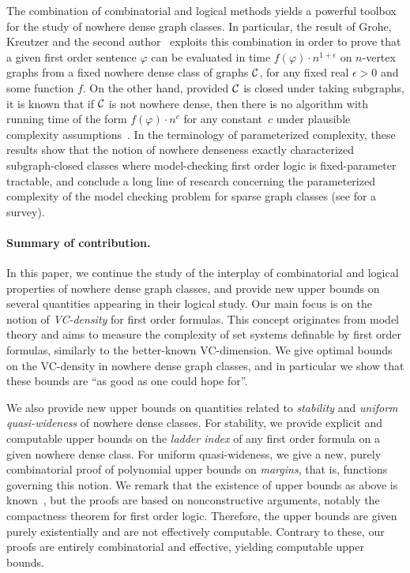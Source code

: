 The combination of combinatorial and logical methods yields a powerful toolbox for the study
of nowhere dense graph classes. In particular, 
the result of Grohe, Kreutzer and the second author~\cite{grohe2014deciding} exploits 
this combination in order to prove that  a given
first order sentence $\varphi$ can be evaluated in time 
$f(\varphi)\cdot n^{1+\epsilon}$ on $n$-vertex graphs from a fixed nowhere dense class of graphs $\mathcal{C}$, for any fixed real $\epsilon>0$ and some function $f$.
On the other hand, provided $\mathcal{C}$ is closed under taking subgraphs, it is known that if $\mathcal{C}$ is not nowhere dense,
then there is no algorithm with running time of the form $f(\varphi)\cdot n^c$ for any constant~$c$ under plausible complexity assumptions~\cite{dvovrak2013testing}.
In the terminology of parameterized complexity, these results show that the notion of nowhere denseness exactly characterized subgraph-closed classes where model-checking first order logic
is fixed-parameter tractable, and conclude a long line of research concerning the parameterized complexity of the model checking problem for sparse graph classes (see \cite{grokre11} for a survey).

\paragraph{Summary of contribution.} In this paper, we continue the study of the 
interplay of combinatorial and logical properties
of nowhere dense graph classes, and provide
new upper bounds on several
quantities appearing in their logical study.
Our main focus is on the notion of \emph{VC-density} for first order formulas. This concept originates from model theory and 
aims to measure the complexity of set systems definable by first order formulas, similarly to the better-known VC-dimension.
We give optimal bounds on the VC-density in nowhere dense graph classes, and in particular we show that these bounds are ``as good as one could hope for''.

We also provide new upper bounds on quantities related to {\em{stability}} and {\em{uniform quasi-wideness}} of nowhere dense classes.
For stability, we provide explicit and computable upper bounds on the \emph{ladder index} of any first order formula on a given nowhere dense class.
For uniform quasi-wideness, we give a new, purely combinatorial proof of polynomial upper bounds on {\em{margins}}, that is, functions governing this notion.
We remark that the existence of upper bounds as above is known~\cite{adler2014interpreting,siebertz2016polynomial}, but the proofs are based on nonconstructive arguments, 
notably the compactness theorem for first order logic. Therefore, the upper bounds are given purely existentially and are not effectively computable.
Contrary to these, our proofs are entirely combinatorial and effective, yielding computable upper bounds.

